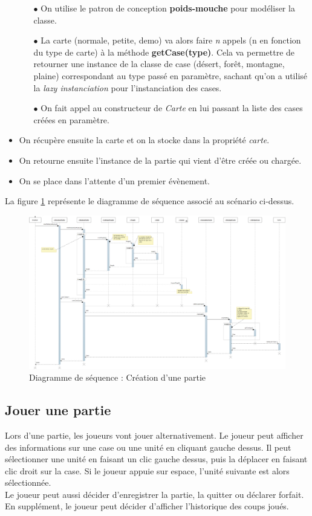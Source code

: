 \documentclass[a4paper,11pt]{article}
\begin{document}
\begin{itemize}
\begin{itemize}
	\item[$\bullet$] On utilise le patron de conception \textbf{poids-mouche} pour modéliser la classe.
	\item[$\bullet$] La carte (normale, petite, demo) va alors faire \textit{n} appels (n en fonction du type de carte) à la méthode \textbf{getCase(type)}. Cela va permettre de retourner une instance de la classe de case (désert, forêt, montagne, plaine) correspondant au type passé en paramètre, sachant qu'on a utilisé la \textit{lazy instanciation} pour l'instanciation des cases.
	\item[$\bullet$] On fait appel au constructeur de \textit{Carte} en lui passant la liste des cases créées en paramètre.
	\end{itemize}
\item On récupère ensuite la carte et on la stocke dans la propriété \textit{carte}.
\item On retourne ensuite l'instance de la partie qui vient d'être créée ou chargée. 
\item On se place dans l'attente d'un premier évènement.
\end{itemize}
\medskip
La figure \ref{ds:cp} représente le diagramme de séquence associé au scénario ci-dessus.
\begin{figure}[H]
	\centering
	\includegraphics[width=\textwidth]{fig/diagramme_sequence_creerPartie}
	\caption{Diagramme de séquence : Création d'une partie}
	\label{ds:cp}
\end{figure} 
\subsection{Jouer une partie}
Lors d'une partie, les joueurs vont jouer alternativement. Le joueur peut afficher des informations sur une case ou une unité en cliquant gauche dessus. Il peut sélectionner une unité en faisant un clic gauche dessus, puis la déplacer en faisant clic droit sur la case. Si le joueur appuie sur espace, l'unité suivante est alors sélectionnée. \\
Le joueur peut aussi décider d'enregistrer la partie, la quitter ou déclarer forfait.\\
En supplément, le joueur peut décider d'afficher l'historique des coups joués.
\end{document}
